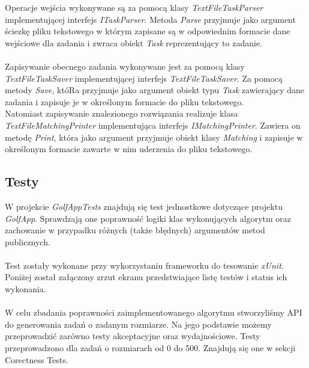 \documentclass[10pt,a4paper]{article}
\begin{document}
	Operacje wejścia wykonywane są za pomocą klasy \textit{TextFileTaskParser} implementującej interfejs \textit{ITaskParser}. Metoda \textit{Parse} przyjmuje jako argument ściezkę pliku tekstowego w którym zapisane są w odpowiednim formacie dane wejściowe dla zadania i zwraca obiekt \textit{Task} reprezentujący to zadanie. \\~\\
	Zapisywanie obecnego zadania wykonywane jest za pomocą klasy \textit{TextFileTaskSaver} implementującej interfejs \textit{TextFileTaskSaver}. Za pomocą metody \textit{Save}, któRa przyjmuje jako argument obiekt typu \textit{Task} zawierający dane zadania i zapisuje je w określonym formacie do pliku tekstowego.\\
	Natomiast zapisywanie znalezionego rozwiązania realizuje klasa \textit{TextFileMatchingPrinter} implementująca interfejs \textit{IMatchingPrinter}. Zawiera on metodę \textit{Print}, która jako argument przyjmuje obiekt klasy \textit{Matching} i zapisuje w określonym formacie zawarte w nim uderzenia do pliku tekstowego.
		
	\subsection{Testy}
	
	W projekcie \textit{GolfAppTests} znajdują się test jednostkowe dotyczące projektu \textit{GolfApp}. Sprawdzają one poprawność logiki klas wykonujących algorytm oraz zachowanie w przypadku różnych (także błędnych) argumentów metod publicznych. \\~\\
	Test zostały wykonane przy wykorzystaniu frameworku do tesowanie \textit{xUnit}. Poniżej został załączony zrzut ekranu przedstwiające listę testów i status ich wykonania. \\~\\
	W celu zbadania poprawności zaimplementowanego algorytmu stworzyliśmy API do generowania zadań o zadanym rozmiarze. Na jego podstawie możemy przeprowadzić zarówno testy akceptacyjne oraz wydajnościowe. Testy przeprowadzono dla zadań o rozmiarach od 0 do 500. Znajdują się one w sekcji Corectness Tests. 
	
\end{document}
